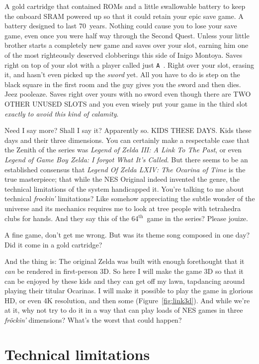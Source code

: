 \documentclass[twocolumn]{article}
\renewcommand\th{$^{\mathrm{th}}$}
\begin{document}
A gold cartridge that contained ROMs and a little swallowable battery
to keep the onboard SRAM powered up so that it could retain your epic
save game. A battery designed to last 70~years. Nothing could cause
you to lose your save game, even once you were half way through the
Second Quest. Unless your little brother starts a completely new game
and saves over your slot, earning him one of the most righteously
deserved clobberings this side of Inigo Montoya. Saves right on top of
your slot with a player called just \verb+A +. Right over your slot,
erasing it, and hasn't even picked up the {\it sword} yet. All you
have to do is step on the black square in the first room and the guy
gives you the sword and then dies. Jeez pooleaze. Saves right over
yours with no sword even though there are TWO OTHER UNUSED SLOTS and
you even wisely put your game in the third slot {\it exactly to avoid
  this kind of calamity}.

\medskip
Need I say more? Shall I say it? Apparently so. KIDS THESE DAYS. Kids
these days and their three dimensions. You can certainly make a
respectable case that the Zenith of the series was {\it Legend of
  Zelda III: A Link To The Past}, or even {\it Legend of Game Boy
  Zelda: I forgot What It's Called}. But there seems to be an
established consensus that {\it Legend Of Zelda LXIV: The Ocarina of
  Time} is the true masterpiece; that while the NES Original indeed
invented the genre, the technical limitations of the system
handicapped it. You're talking to me about technical {\it frockin'}
limitations? Like somehow appreciating the subtle wonder of the
universe and its mechanics requires me to look at tree people with
tetrahedra clubs for hands. And they say this of the 64\th\ game in
the series? Please jouize.

A fine game, don't get me wrong. But was its theme song composed in
one day? Did it come in a gold cartridge?

And the thing is: The original Zelda was built with enough forethought
that it {\em can} be rendered in first-person 3D. So here I will make
the game 3D so that it can be enjoyed by these kids and they can get
off my lawn, tapdancing around playing their titular Ocarinas. I will
make it possible to play the game in glorious HD, or even 4K
resolution, and then some (Figure~\ref{fig:link3d}). And while
we're at it, why not try to do it in a way that can play loads of NES
games in three {\it fr\"ockin'} dimensions? What's the worst that
could happen?


\section{Technical limitations}
\end{document}
